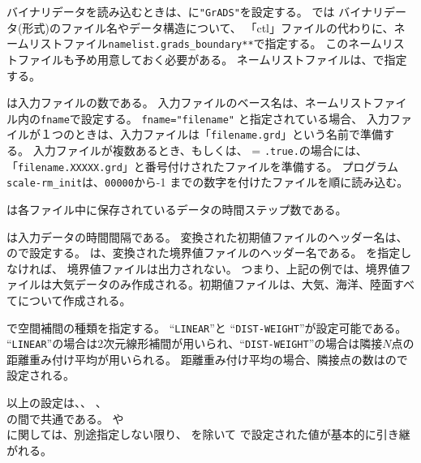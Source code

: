 バイナリデータを読み込むときは、に\verb|"GrADS"|を設定する。
\scalerm では バイナリデータ({\grads}形式)のファイル名やデータ構造について、
「ctl」ファイルの代わりに、ネームリストファイル\verb|namelist.grads_boundary**|で指定する。
このネームリストファイルも予め用意しておく必要がある。
ネームリストファイルは、で指定する。


は入力ファイルの数である。
入力ファイルのベース名は、ネームリストファイル内の\verb|fname|で設定する。
\verb|fname="filename"| と指定されている場合、
入力ファイルが１つのときは、入力ファイルは「\verb|filename.grd|」という名前で準備する。
入力ファイルが複数あるとき、もしくは、 = \verb|.true.|の場合には、
「\verb|filename.XXXXX.grd|」と番号付けされたファイルを準備する。
プログラム\verb|scale-rm_init|は、\verb|00000|から-1 までの数字を付けたファイルを順に読み込む。

は各ファイル中に保存されているデータの時間ステップ数である。

は入力データの時間間隔である。
変換された初期値ファイルのヘッダー名は、ので設定する。
は、変換された境界値ファイルのヘッダー名である。
を指定しなければ、 境界値ファイルは出力されない。
つまり、上記の例では、境界値ファイルは大気データのみ作成される。初期値ファイルは、大気、海洋、陸面すべてについて作成される。


で空間補間の種類を指定する。
``\verb|LINEAR|''と ``\verb|DIST-WEIGHT|''が設定可能である。
``\verb|LINEAR|''の場合は2次元線形補間が用いられ、``\verb|DIST-WEIGHT|''の場合は隣接$N$点の距離重み付け平均が用いられる。
距離重み付け平均の場合、隣接点の数はので設定される。

以上の設定は、、
、\\
の間で共通である。
や \\
に関しては、別途指定しない限り、
 を除いて
で設定された値が基本的に引き継がれる。



